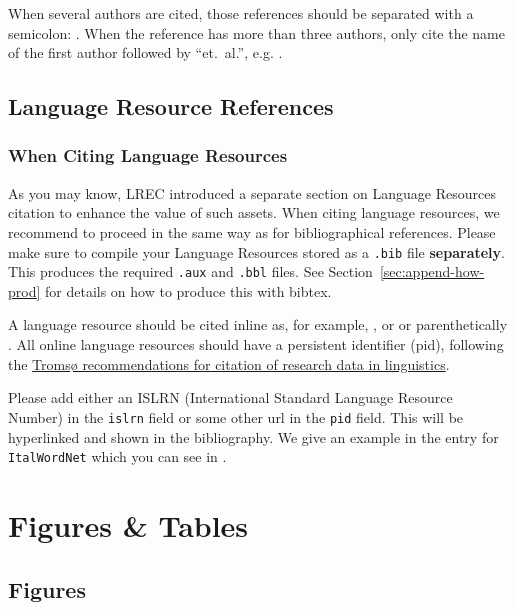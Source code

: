 \documentclass[10pt, a4paper]{article}
\begin{document}
When several authors are cited, those references should be separated with a semicolon: \cite{Martin-90,CastorPollux-92}. When the reference has more than three authors, only cite the name of the first author followed by ``et.\ al.'', e.g. \citet{Superman-Batman-Catwoman-Spiderman-00}.

\subsection{Language Resource References}

\subsubsection{When Citing Language Resources}

As you may know, LREC introduced a separate section on Language
Resources citation to enhance the value of such assets. When citing
language resources, we recommend to proceed in the same way as for
bibliographical references. Please make sure to compile your Language
Resources stored as a \texttt{.bib} file \textbf{separately}. This
produces the required \texttt{.aux} and \texttt{.bbl} files.  See
Section~\ref{sec:append-how-prod} for details on how to produce this
with bibtex.

A language resource should be cited inline as, for example,
, or  or
parenthetically .  All online
language resources should have a persistent identifier (pid), following the \href{https://doi.org/10.15497/RDA00040}{Tromsø recommendations for citation of research data in linguistics}.

Please add either an ISLRN (International Standard Language Resource
Number) in the \texttt{islrn} field or some other url in the
\texttt{pid} field.  This will be hyperlinked and shown in the
bibliography.  We give an example in the entry for \texttt{ItalWordNet} which you can see in .
  



  
\section{Figures \& Tables}

\subsection{Figures}
\end{document}
